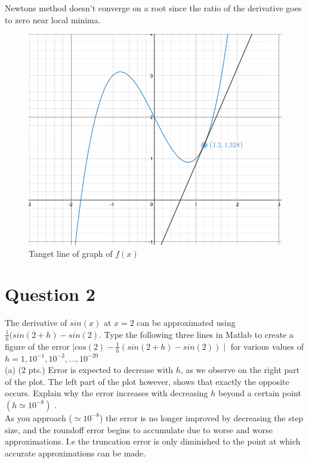 \documentclass{article}
\begin{document}
\noindent
Newtons method doesn't converge on a root since the ratio of the derivative goes to zero near local minima.
\begin{figure}[H]
  \includegraphics[width=\linewidth]{docs/newton-attempt.png}
  \caption{Tanget line of graph of $f(x)$}
\end{figure}


\section*{Question 2} %
The derivative of $sin(x)$ at $x = 2$ can be approximated using $\frac{1}{h}(sin(2 + h) - sin(2)$. Type
the following three lines in Matlab to create a figure of the error $ \mid cos(2) - \frac{1}{h}(sin(2+h) - sin(2)) \mid $
for various values of $h = 1, 10^{-1}, 10^{-2}, . . . , 10^{-20}$ \\

\noindent
(a) (2 pts.) Error is expected to decrease with $h$, as we observe on the right part of the plot. The left part of the plot however, shows that exactly the opposite occurs. Explain why the error increases with decreasing $h$ beyond a certain point $ (h \simeq 10^{-8}) $ . \\

\noindent
As you approach ($\simeq 10^{-8}$) the error is no longer improved by decreasing the step size, and the roundoff error begins to accumulate due to worse and worse approximations. I.e the truncation error is only diminished to the point at which accurate approximations can be made.\\
\end{document}
